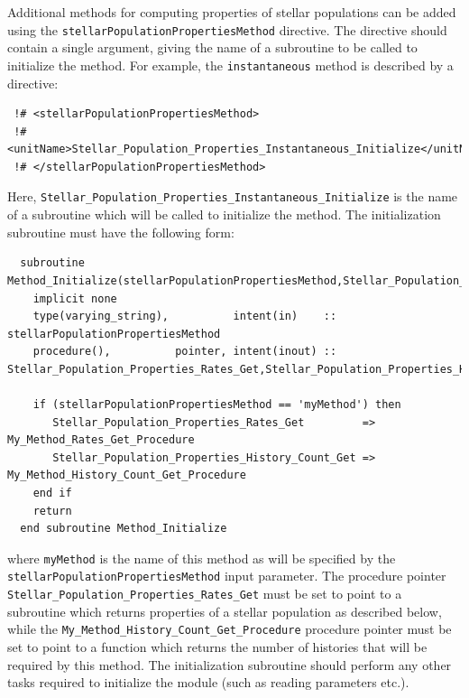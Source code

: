 Additional methods for computing properties of stellar populations can be added using the {\tt stellarPopulationPropertiesMethod} directive. The directive should contain a single argument, giving the name of a subroutine to be called to initialize the method. For example, the {\tt instantaneous} method is described by a directive:
\begin{verbatim}
 !# <stellarPopulationPropertiesMethod>
 !#  <unitName>Stellar_Population_Properties_Instantaneous_Initialize</unitName>
 !# </stellarPopulationPropertiesMethod>
\end{verbatim}
Here, {\tt Stellar\_Population\_Properties\_Instantaneous\_Initialize} is the name of a subroutine which will be called to initialize the method. The initialization subroutine must have the following form:
\begin{verbatim}
  subroutine Method_Initialize(stellarPopulationPropertiesMethod,Stellar_Population_Properties_Rates_Get,Stellar_Population_Properties_History_Count_Get)
    implicit none
    type(varying_string),          intent(in)    :: stellarPopulationPropertiesMethod
    procedure(),          pointer, intent(inout) :: Stellar_Population_Properties_Rates_Get,Stellar_Population_Properties_History_Count_Get
    
    if (stellarPopulationPropertiesMethod == 'myMethod') then
       Stellar_Population_Properties_Rates_Get         => My_Method_Rates_Get_Procedure
       Stellar_Population_Properties_History_Count_Get => My_Method_History_Count_Get_Procedure
    end if
    return
  end subroutine Method_Initialize
\end{verbatim}
where {\tt myMethod} is the name of this method as will be specified by the {\tt stellarPopulationPropertiesMethod} input parameter. The procedure pointer {\tt Stellar\_Population\_Properties\_Rates\_Get} must be set to point to a subroutine which returns properties of a stellar population as described below, while the {\tt My\_Method\_History\_Count\_Get\_Procedure} procedure pointer must be set to point to a function which returns the number of histories that will be required by this method. The initialization subroutine should perform any other tasks required to initialize the module (such as reading parameters etc.).

